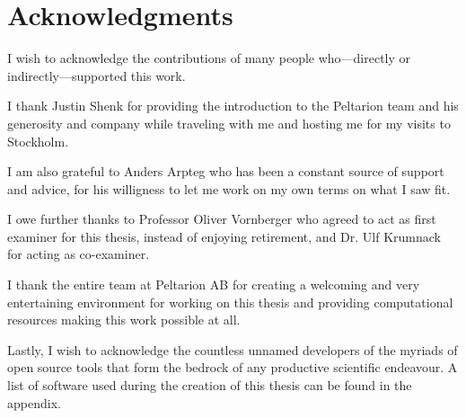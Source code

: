 \chapter*{Acknowledgments}

I wish to acknowledge the contributions of many people who---directly or
indirectly---supported this work.

I thank Justin Shenk for providing the introduction to the Peltarion team and
his generosity and company while traveling with me and
hosting me for my visits to Stockholm.

I am also grateful to Anders Arpteg who has been a constant source of
support and advice, for his willigness to let me work on my own terms on
what I saw fit.

I owe further thanks to Professor Oliver Vornberger who agreed to act as first examiner for this thesis, instead of
enjoying retirement, and Dr. Ulf Krumnack for acting as co-examiner.

I thank the entire team at Peltarion AB for creating a welcoming and very entertaining environment for working on this
thesis and providing computational resources making this work possible at all.

Lastly, I wish to acknowledge the countless unnamed developers of the myriads of open source tools that form the bedrock
of any productive scientific endeavour. A list of software used during the creation of this thesis can be found in the
appendix.
